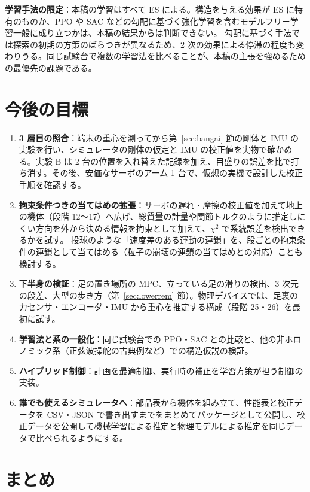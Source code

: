 \documentclass[paper=a4paper,fontsize=10pt,twocolumn,column_gap=2zw,line_length=24zw,number_of_lines=46,head_space=20mm]{jlreq}
\begin{document}
\textbf{学習手法の限定}：本稿の学習はすべて ES による。構造を与える効果が ES に特有のものか、PPO や SAC などの勾配に基づく強化学習を含むモデルフリー学習一般に成り立つかは、本稿の結果からは判断できない。
勾配に基づく手法では探索の初期の方策のばらつきが異なるため、2 次の効果による停滞の程度も変わりうる。同じ試験台で複数の学習法を比べることが、本稿の主張を強めるための最優先の課題である。


\section{今後の目標}

\begin{enumerate}\setlength{\itemsep}{0pt}
\item \textbf{3 層目の照合}：端末の重心を測ってから第~\ref{sec:bangai} 節の剛体と IMU の実験を行い、シミュレータの剛体の仮定と IMU の校正値を実物で確かめる。実験 B は 2 台の位置を入れ替えた記録を加え、目盛りの誤差を比で打ち消す。その後、安価なサーボのアーム 1 台で、仮想の実機で設計した校正手順を確認する。
\item \textbf{拘束条件つきの当てはめの拡張}：サーボの遅れ・摩擦の校正値を加えて地上の機体（段階 12〜17）へ広げ、総質量の計量や関節トルクのように推定しにくい方向を外から決める情報を拘束として加えて、$\chi^2$ で系統誤差を検出できるかを試す。
投球のような「速度差のある運動の連鎖」を、段ごとの拘束条件の連鎖として当てはめる（粒子の崩壊の連鎖の当てはめとの対応）ことも検討する。
\item \textbf{下半身の検証}：足の置き場所の MPC、立っている足の滑りの検出、3 次元の段差、大型の歩き方（第~\ref{sec:lowerrem} 節）。物理デバイスでは、足裏の力センサ・エンコーダ・IMU から重心を推定する構成（段階 25・26）を最初に試す。
\item \textbf{学習法と系の一般化}：同じ試験台での PPO・SAC との比較と、他の非ホロノミック系（正弦波操舵の古典例など）での構造仮説の検証。
\item \textbf{ハイブリッド制御}：計画を最適制御、実行時の補正を学習方策が担う制御の実装。
\item \textbf{誰でも使えるシミュレータへ}：部品表から機体を組み立て、性能表と校正データを CSV・JSON で書き出すまでをまとめてパッケージとして公開し、校正データを公開して機械学習による推定と物理モデルによる推定を同じデータで比べられるようにする。
\end{enumerate}


\section{まとめ}
\end{document}
